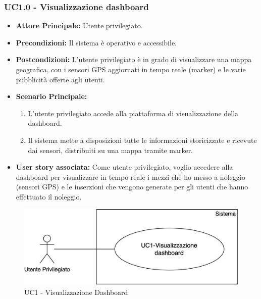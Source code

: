 \documentclass[11pt]{article}
\begin{document}
\begin{justify}
\subsubsection{\textbf{UC1.0 - Visualizzazione dashboard}}
\begin{itemize}
    \item \textbf{Attore Principale:} Utente privilegiato.
    \item \textbf{Precondizioni:} Il sistema è operativo e accessibile.
    \item \textbf{Postcondizioni:} L'utente privilegiato è in grado di visualizzare una mappa geografica, con i 
    sensori GPS aggiornati in tempo reale (marker) e le varie pubblicità offerte agli utenti.
    \item \textbf{Scenario Principale:}
    \begin{enumerate}
        \item L'utente privilegiato accede alla piattaforma di visualizzazione della dashboard.
        \item Il sistema mette a disposizioni tutte le informazioni storicizzate e ricevute dai sensori, distribuiti 
        su una mappa tramite marker.
    \end{enumerate}
    \item \textbf{User story associata:} Come utente privilegiato, voglio accedere alla dashboard per visualizzare 
    in tempo reale i mezzi che ho messo a noleggio (sensori GPS) e le inserzioni che vengono generate per gli 
    utenti che hanno effettuato il noleggio.
    
\end{itemize}
\begin{figure}[ht]
    \centering
    \includegraphics[width=0.5\linewidth]{UC1image.png}
    \caption{UC1 - Visualizzazione Dashboard}
    \label{fig:UC1}
\end{figure}


\end{justify}
\end{document}

